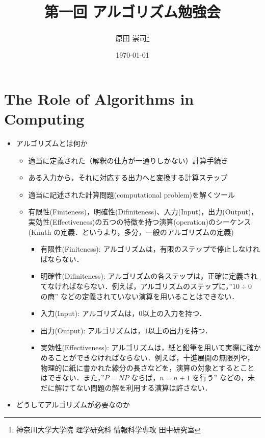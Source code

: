 \documentclass[10pt]{jarticle}
\title{第一回 アルゴリズム勉強会}
\author{原田 崇司\thanks{神奈川大学大学院 理学研究科 情報科学専攻 田中研究室}}
\date{\today}
\begin{document}
\maketitle
\thispagestyle{empty}

%
%
%
%
%
%

\section{The Role of Algorithms in Computing}
\begin{itemize}
 \item アルゴリズムとは何か 
  \begin{itemize}
   \item 適当に定義された（解釈の仕方が一通りしかない）計算手続き
   \item ある入力から，それに対応する出力へと変換する計算ステップ
   \item 適当に記述された計算問題(computational problem)を解くツール
   \item 有限性(Finiteness)，明確性(Difiniteness)、入力(Input)，出力(Output)，実効性(Effectiveness)の五つの特徴を持つ演算(operation)のシーケンス(Knuth の定義．というより，多分，一般のアルゴリズムの定義)
    \begin{itemize}
     \item 有限性(Finiteness): アルゴリズムは，有限のステップで停止しなければならない．
     \item 明確性(Difiniteness): アルゴリズムの各ステップは，正確に定義されてなければならない．例えば，アルゴリズムのステップに，''$10 \div 0$ の商'' などの定義されていない演算を用いることはできない．
     \item 入力(Input): アルゴリズムは，$0$以上の入力を持つ．
     \item 出力(Output): アルゴリズムは，$1$以上の出力を持つ．
     \item 実効性(Effectiveness): アルゴリズムは，紙と鉛筆を用いて実際に確かめることができなければならない．例えば，十進展開の無限列や，物理的に紙に書かれた線分の長さなどを，演算の対象とするとことはできない．また，''$P = NP$ ならば，$n = n + 1$ を行う'' などの，未だに解けてない問題の解を利用する演算は許さない．
    \end{itemize}
  \end{itemize}
 \item どうしてアルゴリズムが必要なのか
\end{itemize}
\end{document}

